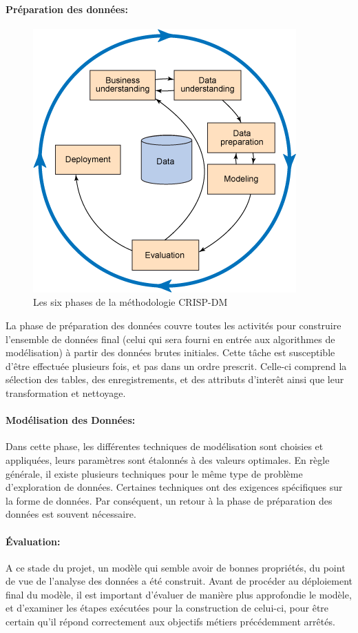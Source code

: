 	\paragraph{Préparation des données:}
	\begin{figure}
	\raggedleft
	\includegraphics[scale=0.5]{crisp-dm}
	\caption{Les six phases de la méthodologie CRISP-DM}
	\label{fig:crisp}
	\end{figure}
	La phase de préparation des données couvre toutes les activités pour construire l'ensemble de données final (celui qui sera fourni en entrée aux algorithmes de modélisation) à partir des données brutes initiales. Cette tâche est susceptible d'être effectuée plusieurs fois, et pas dans un ordre prescrit. Celle-ci comprend la sélection des tables, des enregistrements, et des attributs d'interêt ainsi que leur transformation et nettoyage.
	\paragraph{Modélisation des Données:}
	Dans cette phase, les différentes techniques de modélisation sont choisies et appliquées, leurs paramètres sont étalonnés à des valeurs optimales. En règle générale, il existe plusieurs techniques pour le même type de problème d'exploration de données. Certaines techniques ont des exigences spécifiques sur la forme de données. Par conséquent, un retour à la phase de préparation des données est souvent nécessaire.
	\paragraph{Évaluation:}
	A ce stade du projet, un modèle qui semble avoir de bonnes propriétés, du point de vue de l'analyse des données a été construit. Avant de procéder au déploiement final du modèle, il est important d'évaluer de manière plus approfondie le modèle, et d'examiner les étapes exécutées pour la construction de celui-ci, pour être certain qu'il répond correctement aux objectifs métiers précédemment arrêtés.

